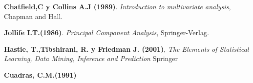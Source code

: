 
\begin{thebibliography}{99}
	

 \textbf{Chatfield,C y Collins A.J (1989)}. {\em Introduction to multivariate analysis}, Chapman and Hall.

 \textbf{Jollife I.T.(1986)}. {\em Principal Component Analysis}, Springer-Verlag.

 \textbf{Hastie, T.,Tibshirani, R. y Friedman J. (2001)}, \textit{The Elements of Statistical Learning, Data Mining, Inference and Prediction} Springer 

 \textbf{Cuadras, C.M.(1991)}
            
          
        
\end{thebibliography}
